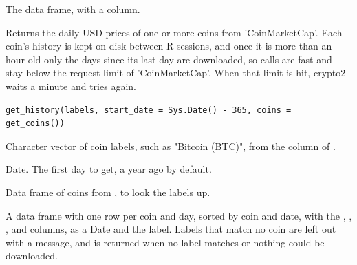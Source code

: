 \documentclass[a4paper]{book}
\begin{document}
%
\begin{Value}
The  data frame, with a 
column.
\end{Value}
%
\begin{Examples}
\end{Examples}
%
\begin{Description}
Returns the daily USD prices of one or more coins from 'CoinMarketCap'.
Each coin's history is kept on disk between R sessions, and once it is
more than an hour old only the days since its last day are downloaded, so
calls are fast and stay below the request limit of 'CoinMarketCap'. When
that limit is hit, crypto2 waits a minute and tries again.
\end{Description}
%
\begin{Usage}
\begin{verbatim}
get_history(labels, start_date = Sys.Date() - 365, coins = get_coins())
\end{verbatim}
\end{Usage}
%
\begin{Arguments}
\begin{ldescription}
\item[\code{labels}] Character vector of coin labels, such as "Bitcoin (BTC)",
from the  column of .

\item[\code{start\_date}] Date. The first day to get, a year ago by default.

\item[\code{coins}] Data frame of coins from , to look the labels up.
\end{ldescription}
\end{Arguments}
%
\begin{Value}
A data frame with one row per coin and day, sorted by coin and
date, with the , , ,  and  columns,
 as a Date and the  label. Labels that match no
coin are left out with a message, and  is returned when no label
matches or nothing could be downloaded.
\end{Value}
\end{document}
